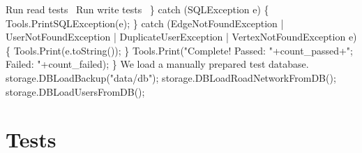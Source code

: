 \documentclass{article}
\def\nwendcode{\endtrivlist \endgroup}
\let\nwdocspar=\par
\begin{document}
    \LA{}Run read tests~{\nwtagstyle{}}\RA{}
    \LA{}Run write tests~{\nwtagstyle{}}\RA{}
  \} catch (SQLException e) \{
    Tools.PrintSQLException(e);
  \} catch (EdgeNotFoundException
        | UserNotFoundException
        | DuplicateUserException
        | VertexNotFoundException e) \{
    Tools.Print(e.toString());
  \}
  Tools.Print("Complete! Passed: "+count_passed+"; Failed: "+count_failed);
\}
\eatline
{}\nwendcode{}We load a manually prepared test database.
\nwenddocs{}\endmoddef{}
storage.DBLoadBackup("data/db");
storage.DBLoadRoadNetworkFromDB();
storage.DBLoadUsersFromDB();
\nwendcode{}\nwdocspar
\section{Tests}
\label{sec:tests}
\end{document}
